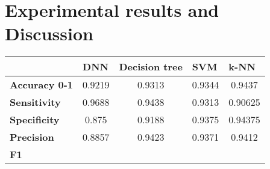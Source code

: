 \section{Experimental results and Discussion}
\label{sec:res}

\begin{table}[]
	\begin{center}
		\begin{tabular}{|l|l|c|c|c|c|}
			\hline
			\multicolumn{2}{|l|}{}                                    
			    
			& 
			\multicolumn{1}{l|}{\textbf{DNN}} & 
			\multicolumn{1}{l|}{\textbf{Decision tree}} & 
			\multicolumn{1}{l|}{\textbf{SVM}} & 
			\multicolumn{1}{l|}{\textbf{k-NN}} \\ \hline
			\multicolumn{2}{|l|}{\textbf{Accuracy 
					0-1}}                                             
					  & 
			0.9219                            &     
			0.9313                           
			&     0.9344                
			&                    0.9437                \\ \hline
			\multicolumn{2}{|l|}{\textbf{Sensitivity}}                
			    
			& 
			0.9688                            &     
			0.9438                         
			&   0.9313                 
			&           0.90625                         \\ \hline
			\multicolumn{2}{|l|}{\textbf{Specificity}}                
			    
			& 
			0.875                            &     
			0.9188                      
			&  0.9375                   
			&            0.94375                        \\ \hline
			\multicolumn{2}{|l|}{\textbf{Precision}}                  
			    
			&       
			0.8857                            &     
			0.9423                       
			&  0.9371                 
			&                     0.9412               \\ \hline
			\multicolumn{2}{|l|}{\textbf{F1}}                         
			    

\end{tabular}
\end{center}
\end{table}
